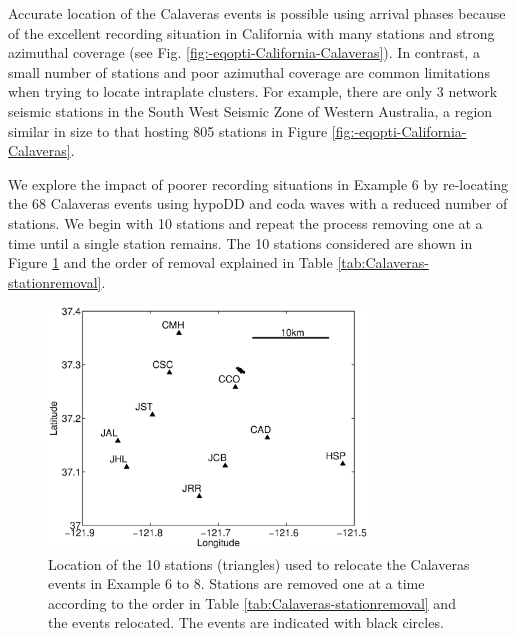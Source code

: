 \documentclass[extra]{gji}
\begin{document}
Accurate location of the Calaveras events is possible using arrival
phases because of the excellent recording situation in California
with many stations and strong azimuthal coverage (see Fig.
\ref{fig:-eqopti-California-Calaveras}). In contrast, a small number
of stations and poor azimuthal coverage are common limitations when
trying to locate intraplate clusters. For example, there are only 3
network seismic stations in the South West Seismic Zone of Western
Australia, a region similar in size to that hosting 805 stations in
Figure \ref{fig:-eqopti-California-Calaveras}.

We explore the impact of poorer recording situations in Example 6 by
re-locating the 68 Calaveras events  using hypoDD and coda waves
with a reduced number of stations. We begin with 10 stations and
repeat the process removing one at a time until a single station
remains. The 10 stations considered are shown in Figure
\ref{fig:-eqopti-Calaveras-substations} and the order of removal
explained in Table \ref{tab:Calaveras-stationremoval}.


\begin{figure}
\noindent\includegraphics[width =
20pc]{diags/CalaverasMap/matlab/Calaveras_substationmap}
\caption{Location of the 10 stations (triangles) used to relocate
the Calaveras events in Example 6 to 8. Stations are removed one at
a time according to the order in Table
\ref{tab:Calaveras-stationremoval} and the events relocated. The
events are indicated with black circles.}
\label{fig:-eqopti-Calaveras-substations}
\end{figure}
\end{document}
